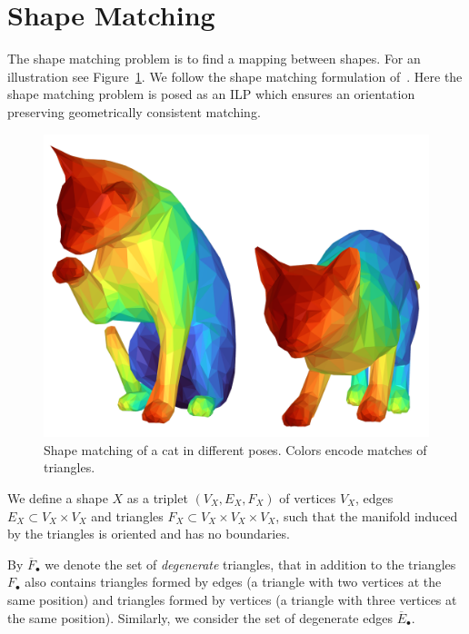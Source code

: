 \section{Shape Matching}
\label{sec:shape-matching}
The shape matching problem is to find a mapping between shapes.
For an illustration see Figure~\ref{fig:shape-matching}.
We follow the shape matching formulation of~\cite{windheuser2011geometrically,windheuser2011large}. Here the shape matching problem is posed as an ILP which ensures an orientation preserving geometrically consistent matching.

\begin{figure}[H]
	\begin{center}
		\includegraphics[width=0.8\columnwidth]{images/cat-matching}
	\end{center}
	\caption{Shape matching of a cat in different poses. Colors encode matches of triangles.}
	\label{fig:shape-matching}
\end{figure}

\begin{definition}[Shape]
	We define a shape $X$ as a triplet $(V_X, E_X,F_X)$ of vertices $V_X$, 
	edges 
	$E_X \subset V_X \times V_X$ 
	and triangles 
	$F_X \subset V_X \times V_X \times V_X$,
	such that the manifold induced by the triangles is oriented and has no boundaries.
\end{definition}

\begin{definition}
	By $\overline{F}_\bullet$ we denote the set of \emph{degenerate} triangles, that in addition to the triangles $F_\bullet$ also contains triangles formed by edges (a triangle with two vertices at the same position) and triangles formed by vertices (a triangle with three vertices at the same position).
	Similarly, we consider the set of degenerate edges $\overline{E}_\bullet$.
\end{definition}



